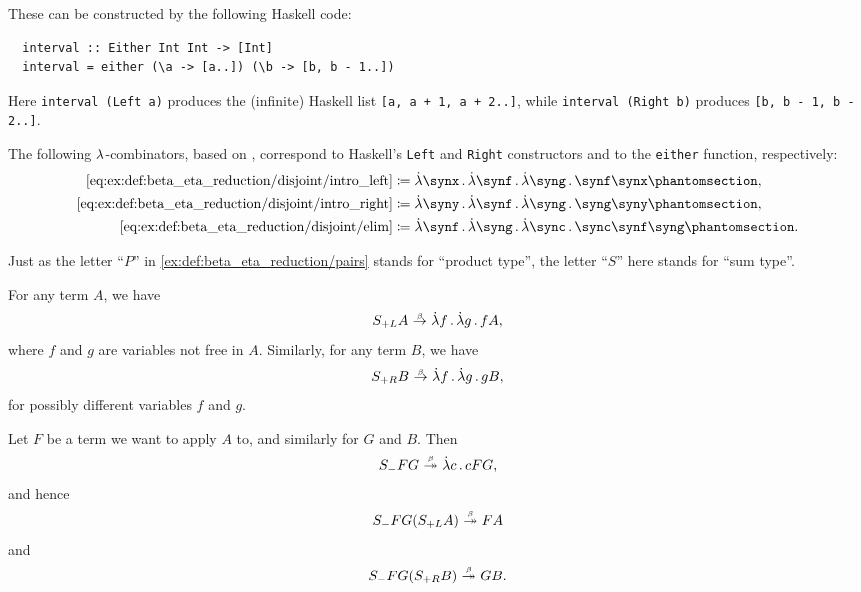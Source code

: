 \begin{example}
\begin{thmenum}
    These can be constructed by the following Haskell code:
    \begin{verbatim}
  interval :: Either Int Int -> [Int]
  interval = either (\a -> [a..]) (\b -> [b, b - 1..])
    \end{verbatim}\vspace{-\baselineskip}

    Here \verb|interval (Left a)| produces the (infinite) Haskell list \verb|[a, a + 1, a + 2..]|, while \verb|interval (Right b)| produces \verb|[b, b - 1, b - 2..]|.

    The following \( {\mathrm \lambda} \)-combinators, based on \cite{MathOF:product_type_in_simply_typed_lambda_terms}, correspond to Haskell's \verb|Left| and \verb|Right| constructors and to the \verb|either| function, respectively:
    \begin{align*}
      \ref{eq:ex:def:beta_eta_reduction/disjoint/intro_left}  &\coloneqq \qabs \synx \qabs \synf \qabs \syng \synf \synx       \taglabel[\ensuremath{ S_{+L} }]{eq:ex:def:beta_eta_reduction/disjoint/intro_left}, \\
      \ref{eq:ex:def:beta_eta_reduction/disjoint/intro_right} &\coloneqq \qabs \syny \qabs \synf \qabs \syng \syng \syny       \taglabel[\ensuremath{ S_{+R} }]{eq:ex:def:beta_eta_reduction/disjoint/intro_right}, \\
      \ref{eq:ex:def:beta_eta_reduction/disjoint/elim}        &\coloneqq \qabs \synf \qabs \syng \qabs \sync \sync \synf \syng \taglabel[\ensuremath{ S_- }]{eq:ex:def:beta_eta_reduction/disjoint/elim}.
    \end{align*}

    Just as the letter \enquote{\( P \)} in \cref{ex:def:beta_eta_reduction/pairs} stands for \enquote{product type}, the letter \enquote{\( S \)} here stands for \enquote{sum type}.

    For any term \( A \), we have
    \begin{equation*}
      S_{+L} A \bred \qabs f \qabs g f A,
    \end{equation*}
    where \( f \) and \( g \) are variables not free in \( A \). Similarly, for any term \( B \), we have
    \begin{equation*}
      S_{+R} B \bred \qabs f \qabs g g B,
    \end{equation*}
    for possibly different variables \( f \) and \( g \).

    Let \( F \) be a term we want to apply \( A \) to, and similarly for \( G \) and \( B \). Then
    \begin{equation*}
      S_- F G \bred* \qabs c c F G,
    \end{equation*}
    and hence
    \begin{equation*}
      S_- F G (S_{+L} A) \bred* F A
    \end{equation*}
    and
    \begin{equation*}
      S_- F G (S_{+R} B) \bred* G B.
    \end{equation*}


\end{thmenum}
\end{example}
